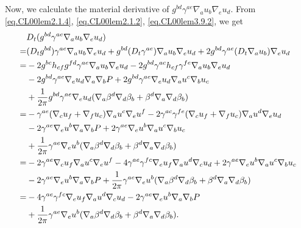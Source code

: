\documentclass[12pt,reqno]{amsart}
\numberwithin{equation}{section}
\theoremstyle{definition}
\theoremstyle{remark}
\begin{document}
Now, we calculate the material derivative of $g^{bd}\gamma^{ae}{\nabla}_a u_b{\nabla}_e u_d$. From \eqref{eq.CL00lem2.1.4}, \eqref{eq.CL00lem2.1.2}, \eqref{eq.CL00lem3.9.2}, we get
\begin{align} \label{eq.1energy3}
  &D_t(g^{bd}\gamma^{ae}{\nabla}_a u_b{\nabla}_e u_d){\nonumber}\\
  =&(D_t g^{bd})\gamma^{ae}{\nabla}_a u_b{\nabla}_e u_d +g^{bd}(D_t\gamma^{ae}){\nabla}_a u_b{\nabla}_e u_d +2g^{bd}\gamma^{ae}(D_t{\nabla}_a u_b){\nabla}_e u_d{\nonumber}\\
  =&-2g^{bc}h_{cf}g^{fd}\gamma^{ae}{\nabla}_a u_b{\nabla}_e u_d -2g^{bd}\gamma^{ac}h_{cf}\gamma^{fe}{\nabla}_a u_b{\nabla}_e u_d{\nonumber}\\
  &-2g^{bd}\gamma^{ae}{\nabla}_e u_d{\nabla}_a{\nabla}_b{P } +2g^{bd}\gamma^{ae}{\nabla}_e u_d{\nabla}_a u^c{\nabla}_bu_c{\nonumber}\\
  &+\frac{1}{2\pi}g^{bd}\gamma^{ae}{\nabla}_e u_d({\nabla}_a\beta^d {\nabla}_d\beta_b+\beta^d{\nabla}_a{\nabla}_d\beta_b){\nonumber}\\
  =&-\gamma^{ae}({\nabla}_cu_f+{\nabla}_fu_c){\nabla}_a u^c{\nabla}_e u^f -2\gamma^{ac}\gamma^{fe}({\nabla}_cu_f+{\nabla}_fu_c){\nabla}_a u^d{\nabla}_e u_d{\nonumber}\\
  &-2\gamma^{ae}{\nabla}_e u^b{\nabla}_a{\nabla}_b{P }
  +2\gamma^{ae}{\nabla}_e u^b{\nabla}_a u^c{\nabla}_bu_c{\nonumber}\\
  &+\frac{1}{2\pi}\gamma^{ae}{\nabla}_e u^b({\nabla}_a\beta^d {\nabla}_d\beta_b+\beta^d{\nabla}_a{\nabla}_d\beta_b){\nonumber}\\
  =&-2\gamma^{ae}{\nabla}_cu_f{\nabla}_a u^c{\nabla}_e u^f -4\gamma^{ae}\gamma^{fc}{\nabla}_eu_f{\nabla}_a u^d{\nabla}_c u_d+2\gamma^{ae}{\nabla}_e u^b{\nabla}_a u^c{\nabla}_bu_c{\nonumber}\\
  &-2\gamma^{ae}{\nabla}_e u^b{\nabla}_a{\nabla}_b{P } +\frac{1}{2\pi}\gamma^{ae}{\nabla}_e u^b({\nabla}_a\beta^d {\nabla}_d\beta_b+\beta^d{\nabla}_a{\nabla}_d\beta_b){\nonumber}\\
  =&-4\gamma^{ae}\gamma^{fc}{\nabla}_eu_f{\nabla}_a u^d{\nabla}_c u_d-2\gamma^{ae}{\nabla}_e u^b{\nabla}_a{\nabla}_b{P } {\nonumber}\\
  &+\frac{1}{2\pi}\gamma^{ae}{\nabla}_e u^b({\nabla}_a\beta^d {\nabla}_d\beta_b+\beta^d{\nabla}_a{\nabla}_d\beta_b).
\end{align}
\end{document}
